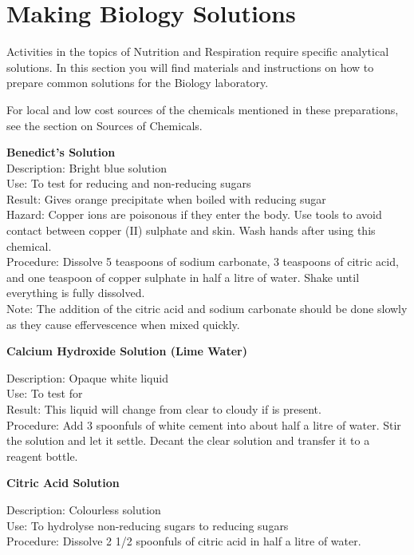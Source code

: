 \chapter{Making Biology Solutions}
Activities in the topics of Nutrition and Respiration require specific analytical solutions. In this section you will find materials and instructions on how to prepare common solutions for the Biology laboratory.

For local and low cost sources of the chemicals mentioned in these preparations, see the section on Sources of Chemicals.

\begin{flushleft}
\textbf{Benedict's Solution}\\
Description: Bright blue solution\\
Use: To test for reducing and non-reducing sugars\\
Result: Gives orange precipitate when boiled with reducing sugar\\
Hazard: Copper ions are poisonous if they enter the body. Use tools to avoid contact between copper (II) sulphate and skin. Wash hands after using this chemical.\\
Procedure: Dissolve 5 teaspoons of sodium carbonate, 3 teaspoons of citric acid,
and one teaspoon of copper sulphate in half a litre of water. Shake until everything is fully dissolved.\\Note: The addition of the citric acid and sodium carbonate should be done slowly as they cause effervescence when mixed quickly.
\end{flushleft}

\begin{flushleft}
\textbf{Calcium Hydroxide Solution (Lime Water)}
\end{flushleft}
\vspace{-10pt}
Description: Opaque white liquid\\
Use: To test for \\
Result: This liquid will change from clear to cloudy if  is present.\\
Procedure: Add 3 spoonfuls of white cement into about half a litre of water. Stir the solution and let it settle. Decant the clear solution and transfer it to a reagent bottle.\\

\begin{flushleft}
\textbf{Citric Acid Solution}
\end{flushleft}
\vspace{-10pt}
Description: Colourless solution\\
Use: To hydrolyse non-reducing sugars to reducing sugars\\
Procedure: Dissolve 2 1/2 spoonfuls of citric acid in half a litre of water.\\


